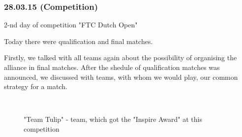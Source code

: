 \subsubsection{28.03.15 (Competition)}
\begin{center}
	2-nd day of competition "FTC Dutch Open"
\end{center}
Today there were qualification and final matches.\newline

Firstly, we talked with all teams again about the possibility of organising the alliance in final matches. After the shedule of qualification matches was announced, we discussed with teams, with whom we would play, our common strategy for a match.\newline
\begin{figure}[H]
	\begin{minipage}[h]{0.2\linewidth}
		\center  
	\end{minipage}
	\begin{minipage}[h]{0.6\linewidth}
		\caption{"Team Tulip" - team, which got the "Inspire Award" at this competition}
	\end{minipage}
\end{figure}

